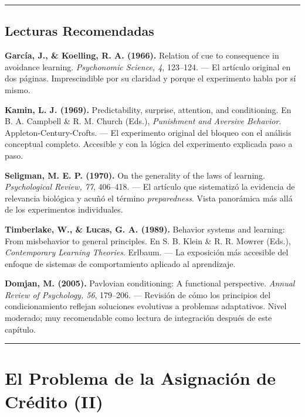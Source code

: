 \documentclass[
  letterpaper,
  DIV=11,
  numbers=noendperiod]{scrreprt}
\begin{document}
\begin{tcolorbox}[enhanced jigsaw, arc=.35mm, bottomrule=.15mm, breakable, colback=white, colframe=quarto-callout-note-color-frame, left=2mm, leftrule=.75mm, opacityback=0, rightrule=.15mm, toprule=.15mm]
\begin{center}\rule{0.5\linewidth}{0.5pt}\end{center}

\section{Lecturas Recomendadas}\label{lecturas-recomendadas}

\textbf{García, J., \& Koelling, R. A. (1966).} Relation of cue to
consequence in avoidance learning. \emph{Psychonomic Science, 4},
123--124. --- El artículo original en dos páginas. Imprescindible por su
claridad y porque el experimento habla por sí mismo.

\textbf{Kamin, L. J. (1969).} Predictability, surprise, attention, and
conditioning. En B. A. Campbell \& R. M. Church (Eds.), \emph{Punishment
and Aversive Behavior}. Appleton-Century-Crofts. --- El experimento
original del bloqueo con el análisis conceptual completo. Accesible y
con la lógica del experimento explicada paso a paso.

\textbf{Seligman, M. E. P. (1970).} On the generality of the laws of
learning. \emph{Psychological Review, 77}, 406--418. --- El artículo que
sistematizó la evidencia de relevancia biológica y acuñó el término
\emph{preparedness}. Vista panorámica más allá de los experimentos
individuales.

\textbf{Timberlake, W., \& Lucas, G. A. (1989).} Behavior systems and
learning: From misbehavior to general principles. En S. B. Klein \& R.
R. Mowrer (Eds.), \emph{Contemporary Learning Theories}. Erlbaum. --- La
exposición más accesible del enfoque de sistemas de comportamiento
aplicado al aprendizaje.

\textbf{Domjan, M. (2005).} Pavlovian conditioning: A functional
perspective. \emph{Annual Review of Psychology, 56}, 179--206. ---
Revisión de cómo los principios del condicionamiento reflejan soluciones
evolutivas a problemas adaptativos. Nivel moderado; muy recomendable
como lectura de integración después de este capítulo.

\begin{center}\rule{0.5\linewidth}{0.5pt}\end{center}


\chapter{El Problema de la Asignación de Crédito
(II)}\label{el-problema-de-la-asignaciuxf3n-de-cruxe9dito-ii}


\end{tcolorbox}
\end{document}
